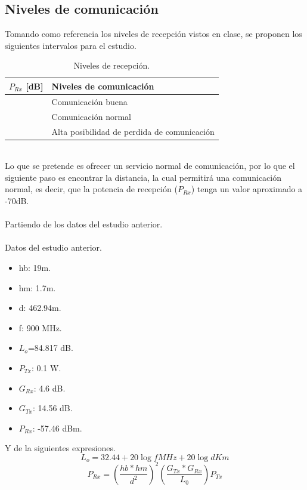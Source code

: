 \documentclass[11pt,letterpaper]{article}
\begin{document}
\subsection{Niveles de comunicación}
Tomando como referencia los niveles de recepción vistos en clase, se proponen los 
siguientes intervalos para el estudio. 
\begin{table}[ht]
    \centering
    \begin{tabular}{|l|l|}
    \hline
    $P_{Rx}$ [dB] & Niveles de comunicación \\ \hline
    [0, -40] & Comunicación buena \\ \hline
    [-41, -70] & Comunicación normal \\ \hline
    [-71, -90] & Alta posibilidad de perdida de comunicación \\ \hline
    \end{tabular}
    \caption{Niveles de recepción.}
\end{table}
\\
Lo que se pretende es ofrecer un servicio normal de comunicación, por lo que el 
siguiente paso es encontrar la distancia, la cual permitirá una comunicación normal, 
es decir, que la potencia de recepción ($P_{Rx}$) tenga un valor aproximado a -70dB.
\\ \\
Partiendo de los datos del estudio anterior.
\\ \\
Datos del estudio anterior.
\begin{itemize}
    \item hb: 19m.
    \item hm: 1.7m.
    \item d: 462.94m.
    \item f: 900 MHz.
    \item $L_o$=84.817 dB.
    \item $P_{Tx}$: 0.1 W.
    \item $G_{Rx}$: 4.6 dB.
    \item $G_{Tx}$: 14.56 dB.
    \item $P_{Rx}$: -57.46 dBm.
\end{itemize}

Y de la siguientes expresiones.
\begin{equation}
    L_o=32.44+20\log{fMHz}+20\log{dKm}
\end{equation}
\begin{equation}
    P_{Rx}=(\frac{hb*hm}{d^2})^2 (\frac{G_{Tx}*G_{Rx}}{L_0}) P_{Tx}
\end{equation}
\end{document}
